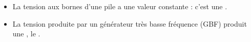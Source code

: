 \begin{mybilan}
	\begin{itemize}
		\item La tension aux bornes d'une pile a une valeur constante : c'est une .
		\item La tension produite par un générateur très basse fréquence (GBF) produit une , le .
	\end{itemize}
\end{mybilan}